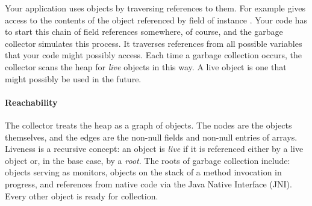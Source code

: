 Your application uses objects by traversing references to them. For example
  gives access to the contents of the object referenced by field
 of instance . Your code has to start this chain of field
references somewhere, of course, and the garbage collector simulates this
process. It traverses references from all possible variables that your code
might possibly access. Each time a garbage collection occurs, the collector
scans the heap for \emph{live} objects in this way. A live object is one that
might possibly be used in the future.

\paragraph{Reachability}
The collector treats the heap as a graph of objects. The nodes are the objects
themselves, and the edges are the non-null fields and non-null entries of
arrays.  Liveness is a recursive concept: an
object is \emph{live} if it is referenced either by a live object or, in the
base case, by a \emph{root}. The roots of garbage collection include: objects
serving as monitors, objects on the stack of a method invocation in progress,
and references from native code via the Java Native Interface (JNI). Every other
object is ready for collection.

